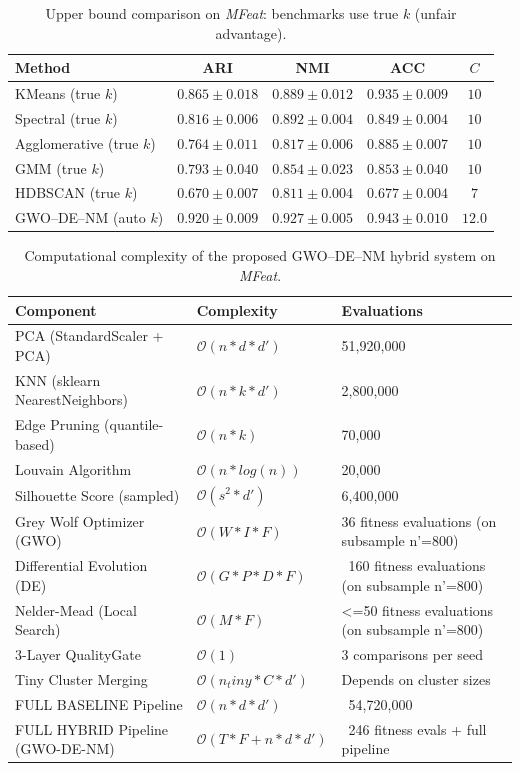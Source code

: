 \begin{table}[htbp]
\centering\small
\caption{Upper bound comparison on \textit{MFeat}: benchmarks use true $k$ (unfair advantage).}
\label{tab:upper_mfeat}
\begin{tabular}{lcccc}
\toprule
Method & ARI & NMI & ACC & $C$ \\
\midrule
KMeans (true $k$) & $0.865 \pm 0.018$ & $0.889 \pm 0.012$ & $0.935 \pm 0.009$ & $10$ \\
Spectral (true $k$) & $0.816 \pm 0.006$ & $0.892 \pm 0.004$ & $0.849 \pm 0.004$ & $10$ \\
Agglomerative (true $k$) & $0.764 \pm 0.011$ & $0.817 \pm 0.006$ & $0.885 \pm 0.007$ & $10$ \\
GMM (true $k$) & $0.793 \pm 0.040$ & $0.854 \pm 0.023$ & $0.853 \pm 0.040$ & $10$ \\
HDBSCAN (true $k$) & $0.670 \pm 0.007$ & $0.811 \pm 0.004$ & $0.677 \pm 0.004$ & $7$ \\
\midrule
GWO--DE--NM (auto $k$) & $\mathbf{0.920 \pm 0.009}$ & $\mathbf{0.927 \pm 0.005}$ & $\mathbf{0.943 \pm 0.010}$ & $12.0$ \\
\bottomrule
\end{tabular}
\end{table}

\begin{table}[htbp]
\centering
\small
\caption{Computational complexity of the proposed GWO--DE--NM hybrid system on \textit{MFeat}.}
\label{tab:complexity_mfeat}
\begin{tabular}{lll}
\toprule
Component & Complexity & Evaluations \\
\midrule
PCA (StandardScaler + PCA) & $\mathcal{O}(n * d * d')$ & 51,920,000 \\
KNN (sklearn NearestNeighbors) & $\mathcal{O}(n * k * d')$ & 2,800,000 \\
Edge Pruning (quantile-based) & $\mathcal{O}(n * k)$ & 70,000 \\
Louvain Algorithm & $\mathcal{O}(n * log(n))$ & 20,000 \\
Silhouette Score (sampled) & $\mathcal{O}(s^2 * d')$ & 6,400,000 \\
Grey Wolf Optimizer (GWO) & $\mathcal{O}(W * I * F)$ & 36 fitness evaluations (on subsample n'=800) \\
Differential Evolution (DE) & $\mathcal{O}(G * P * D * F)$ & ~160 fitness evaluations (on subsample n'=800) \\
Nelder-Mead (Local Search) & $\mathcal{O}(M * F)$ & <=50 fitness evaluations (on subsample n'=800) \\
3-Layer QualityGate & $\mathcal{O}(1)$ & 3 comparisons per seed \\
Tiny Cluster Merging & $\mathcal{O}(n_tiny * C * d')$ & Depends on cluster sizes \\
\midrule
FULL BASELINE Pipeline & $\mathcal{O}(n * d * d')$ & ~54,720,000 \\
\midrule
FULL HYBRID Pipeline (GWO-DE-NM) & $\mathcal{O}(T * F + n * d * d')$ & ~246 fitness evals + full pipeline \\
\bottomrule
\end{tabular}
\end{table}